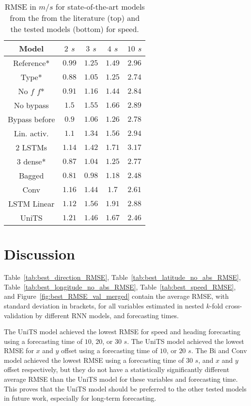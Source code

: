 \documentclass[preprint,12pt]{elsarticle}
\begin{document}
\begin{table}[!ht]
	\centering
    \begin{tabular}{|c|c|c|c|c|}
        \hline
        Model & $2$ $s$ & $3$ $s$ & $4$ $s$ & $10$ $s$ \\ \hline
        Reference* & $0.99$ & $1.25$ & $1.49$ & $2.96$ \\
        Type* & $0.88$ & $1.05$ & $1.25$ & $2.74$ \\
        No $f$ $f$* & $0.91$ & $1.16$ & $1.44$ & $2.84$ \\
        No bypass & $1.5$ & $1.55$ & $1.66$ & $2.89$ \\
        Bypass before & $0.9$ & $1.06$ & $1.26$ & $2.78$ \\
        Lin. activ. & $1.1$ & $1.34$ & $1.56$ & $2.94$ \\
        2 LSTMs & $1.14$ & $1.42$ & $1.71$ & $3.17$ \\
        3 dense* & $0.87$ & $1.04$ & $1.25$ & $2.77$ \\
        Bagged & $\mathbf{0.81}$ & $\mathbf{0.98}$ & $\mathbf{1.18}$ & $2.48$ \\ \hline
        Conv & $1.16$ & $1.44$ & $1.7$ & $2.61$ \\
        LSTM Linear & $1.12$ & $1.56$ & $1.91$ & $2.88$ \\
        UniTS & $1.21$ & $1.46$ & $1.67$ & $\mathbf{2.46}$ \\ \hline
    \end{tabular}
    \caption{RMSE in $m/s$ for state-of-the-art models from the from the literature (top) and the tested models (bottom) for speed.}
    \label{tab:longitudinal_speed}
\end{table}

\section{Discussion}
\label{sec:Discussion}

Table~\ref{tab:best_direction_RMSE}, Table~\ref{tab:best_latitude_no_abs_RMSE}, Table~\ref{tab:best_longitude_no_abs_RMSE}, Table~\ref{tab:best_speed_RMSE}, and Figure~\ref{fig:best_RMSE_val_merged} contain the average RMSE, with standard deviation in brackets, for all variables estimated in nested $k$-fold cross-validation by different RNN models, and forecasting times.

The UniTS model achieved the lowest RMSE for speed and heading forecasting using a forecasting time of $10$, $20$, or $30$ $s$. The UniTS model achieved the lowest RMSE for $x$ and $y$ offset using a forecasting time of $10$, or $20$ $s$. The Bi and Conv model achieved the lowest RMSE using a forecasting time of $30$ $s$, and $x$ and $y$ offset respectively, but they do not have a statistically significantly different average RMSE than the UniTS model for these variables and forecasting time. This proves that the UniTS model should be preferred to the other tested models in future work, especially for long-term forecasting.
\end{document}
